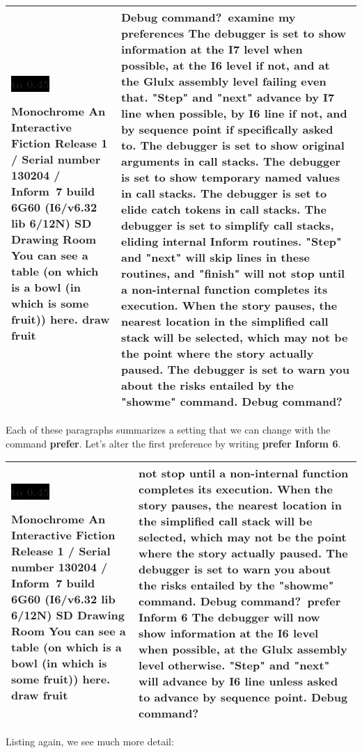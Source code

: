 \documentclass{book}
\newcommand{\n}{\hspace*{\fill}\newline}
\newcommand{\terp}[2]{\begin{center}\begin{tabular}{p{0.45\textwidth}|p{0.45\textwidth}}\midrule #1&#2\\\midrule\end{tabular}\end{center}}
\newcommand{\glkheading}[1]{\textbf{#1}}
\newcommand{\glkinput}[1]{\textbf{#1}}
\newcommand{\glkstatusline}[2]{\centerline{\colorbox{black}{\hbox to 0.45\textwidth{\textcolor{white}{#1\hfil #2}}}}}
\newcommand{\storyprompt}{\raisebox{1.5pt}{\(>\)}}
\newcommand{\cursor}{\raisebox{-1.5pt}{\RectangleThin}}
\begin{document}
\terp{\glkstatusline{Drawing Room}{0/1}\n
  \glkheading{Monochrome}\n
  An Interactive Fiction\n
  Release 1 / Serial number 130204 / Inform~7 build 6G60 (I6/v6.32 lib 6/12N) SD\n
  \n
  \glkheading{Drawing Room}\n
  You can see a table (on which is a bowl (in which is some fruit)) here.\n
  \n
  \storyprompt\glkinput{draw fruit}}{%
  Debug command?\ \glkinput{examine my preferences}\n
  \n
  The debugger is set to show information at the I7 level when possible, at the I6 level if not, and at the Glulx assembly level failing even that.  "Step" and "next" advance by I7 line when possible, by I6 line if not, and by sequence point if specifically asked to.\n
  The debugger is set to show original arguments in call stacks.\n
  The debugger is set to show temporary named values in call stacks.\n
  The debugger is set to elide catch tokens in call stacks.\n
  The debugger is set to simplify call stacks, eliding internal Inform routines.  "Step" and "next" will skip lines in these routines, and "finish" will not stop until a non-internal function completes its execution.  When the story pauses, the nearest location in the simplified call stack will be selected, which may not be the point where the story actually paused.\n
  The debugger is set to warn you about the risks entailed by the "showme" command.\n
  \n
  Debug command?\ \cursor}

Each of these paragraphs summarizes a setting that we can change with the
command \glkinput{prefer}.  Let's alter the first preference by writing
\glkinput{prefer Inform 6}.

\terp{\glkstatusline{Drawing Room}{0/1}\n
  \glkheading{Monochrome}\n
  An Interactive Fiction\n
  Release 1 / Serial number 130204 / Inform~7 build 6G60 (I6/v6.32 lib 6/12N) SD\n
  \n
  \glkheading{Drawing Room}\n
  You can see a table (on which is a bowl (in which is some fruit)) here.\n
  \n
  \storyprompt\glkinput{draw fruit}}{%
  not stop until a non-internal function completes its execution.  When the story pauses, the nearest location in the simplified call stack will be selected, which may not be the point where the story actually paused.\n
  The debugger is set to warn you about the risks entailed by the "showme" command.\n
  \n
  Debug command?\ \glkinput{prefer Inform 6}\n
  \n
  The debugger will now show information at the I6 level when possible, at the Glulx assembly level otherwise.  "Step" and "next" will advance by I6 line unless asked to advance by sequence point.\n
  \n
  Debug command?\ \cursor}

Listing again, we see much more detail:
\end{document}
